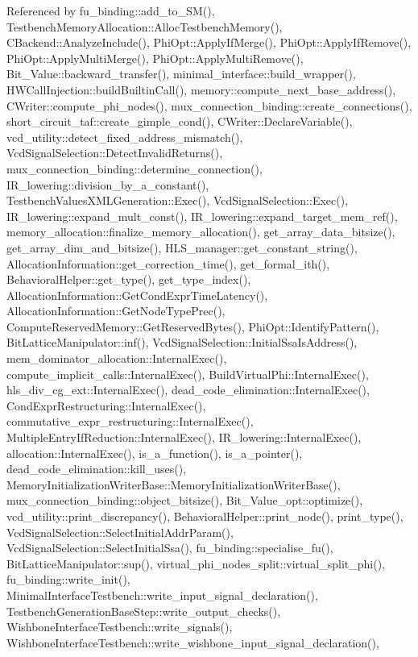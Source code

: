 Referenced by fu\+\_\+binding\+::add\+\_\+to\+\_\+\+S\+M(), Testbench\+Memory\+Allocation\+::\+Alloc\+Testbench\+Memory(), C\+Backend\+::\+Analyze\+Include(), Phi\+Opt\+::\+Apply\+If\+Merge(), Phi\+Opt\+::\+Apply\+If\+Remove(), Phi\+Opt\+::\+Apply\+Multi\+Merge(), Phi\+Opt\+::\+Apply\+Multi\+Remove(), Bit\+\_\+\+Value\+::backward\+\_\+transfer(), minimal\+\_\+interface\+::build\+\_\+wrapper(), H\+W\+Call\+Injection\+::build\+Builtin\+Call(), memory\+::compute\+\_\+next\+\_\+base\+\_\+address(), C\+Writer\+::compute\+\_\+phi\+\_\+nodes(), mux\+\_\+connection\+\_\+binding\+::create\+\_\+connections(), short\+\_\+circuit\+\_\+taf\+::create\+\_\+gimple\+\_\+cond(), C\+Writer\+::\+Declare\+Variable(), vcd\+\_\+utility\+::detect\+\_\+fixed\+\_\+address\+\_\+mismatch(), Vcd\+Signal\+Selection\+::\+Detect\+Invalid\+Returns(), mux\+\_\+connection\+\_\+binding\+::determine\+\_\+connection(), I\+R\+\_\+lowering\+::division\+\_\+by\+\_\+a\+\_\+constant(), Testbench\+Values\+X\+M\+L\+Generation\+::\+Exec(), Vcd\+Signal\+Selection\+::\+Exec(), I\+R\+\_\+lowering\+::expand\+\_\+mult\+\_\+const(), I\+R\+\_\+lowering\+::expand\+\_\+target\+\_\+mem\+\_\+ref(), memory\+\_\+allocation\+::finalize\+\_\+memory\+\_\+allocation(), get\+\_\+array\+\_\+data\+\_\+bitsize(), get\+\_\+array\+\_\+dim\+\_\+and\+\_\+bitsize(), H\+L\+S\+\_\+manager\+::get\+\_\+constant\+\_\+string(), Allocation\+Information\+::get\+\_\+correction\+\_\+time(), get\+\_\+formal\+\_\+ith(), Behavioral\+Helper\+::get\+\_\+type(), get\+\_\+type\+\_\+index(), Allocation\+Information\+::\+Get\+Cond\+Expr\+Time\+Latency(), Allocation\+Information\+::\+Get\+Node\+Type\+Prec(), Compute\+Reserved\+Memory\+::\+Get\+Reserved\+Bytes(), Phi\+Opt\+::\+Identify\+Pattern(), Bit\+Lattice\+Manipulator\+::inf(), Vcd\+Signal\+Selection\+::\+Initial\+Ssa\+Is\+Address(), mem\+\_\+dominator\+\_\+allocation\+::\+Internal\+Exec(), compute\+\_\+implicit\+\_\+calls\+::\+Internal\+Exec(), Build\+Virtual\+Phi\+::\+Internal\+Exec(), hls\+\_\+div\+\_\+cg\+\_\+ext\+::\+Internal\+Exec(), dead\+\_\+code\+\_\+elimination\+::\+Internal\+Exec(), Cond\+Expr\+Restructuring\+::\+Internal\+Exec(), commutative\+\_\+expr\+\_\+restructuring\+::\+Internal\+Exec(), Multiple\+Entry\+If\+Reduction\+::\+Internal\+Exec(), I\+R\+\_\+lowering\+::\+Internal\+Exec(), allocation\+::\+Internal\+Exec(), is\+\_\+a\+\_\+function(), is\+\_\+a\+\_\+pointer(), dead\+\_\+code\+\_\+elimination\+::kill\+\_\+uses(), Memory\+Initialization\+Writer\+Base\+::\+Memory\+Initialization\+Writer\+Base(), mux\+\_\+connection\+\_\+binding\+::object\+\_\+bitsize(), Bit\+\_\+\+Value\+\_\+opt\+::optimize(), vcd\+\_\+utility\+::print\+\_\+discrepancy(), Behavioral\+Helper\+::print\+\_\+node(), print\+\_\+type(), Vcd\+Signal\+Selection\+::\+Select\+Initial\+Addr\+Param(), Vcd\+Signal\+Selection\+::\+Select\+Initial\+Ssa(), fu\+\_\+binding\+::specialise\+\_\+fu(), Bit\+Lattice\+Manipulator\+::sup(), virtual\+\_\+phi\+\_\+nodes\+\_\+split\+::virtual\+\_\+split\+\_\+phi(), fu\+\_\+binding\+::write\+\_\+init(), Minimal\+Interface\+Testbench\+::write\+\_\+input\+\_\+signal\+\_\+declaration(), Testbench\+Generation\+Base\+Step\+::write\+\_\+output\+\_\+checks(), Wishbone\+Interface\+Testbench\+::write\+\_\+signals(), Wishbone\+Interface\+Testbench\+::write\+\_\+wishbone\+\_\+input\+\_\+signal\+\_\+declaration(), 